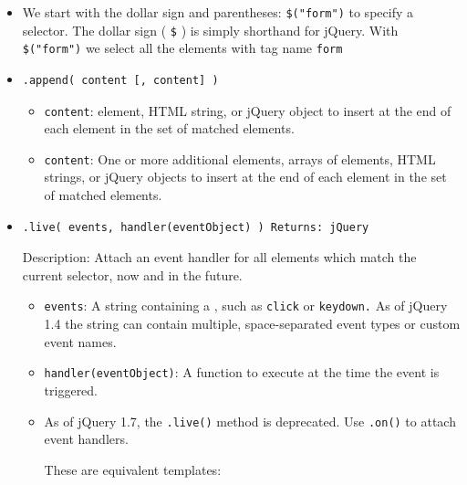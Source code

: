 \begin{itemize}
\item
We start with the dollar sign and parentheses:
\verb|$("form")| to specify a selector. 
The dollar sign ( \verb|$| ) is simply shorthand for jQuery.
With \verb|$("form")| we select all the elements with tag name \verb|form|

\item
\begin{verbatim}
.append( content [, content] )
\end{verbatim}
  \begin{itemize}
  \item
  \verb|content|:  element, HTML string, or jQuery object to insert
  at the end of each element in the set of matched elements.

  \item
  \verb|content|: One or more additional  elements, arrays of
  elements, HTML strings, or jQuery objects to insert at the end of
  each element in the set of matched elements.
  \end{itemize}

\item
\begin{verbatim}
.live( events, handler(eventObject) ) Returns: jQuery
\end{verbatim}
Description: Attach an event handler for all elements which match the current selector, now and in the future.

  \begin{itemize}
  \item
  \verb|events|: A string containing a , such as \verb"click" or \verb"keydown." 
  As of jQuery 1.4 the string can contain multiple, space-separated event types or custom event names.
  \item
  \verb|handler(eventObject)|: A function to execute at the time the event is triggered.

    \item 
    As of jQuery 1.7, the \verb|.live()| method is deprecated. 
    Use \verb|.on()| to attach event handlers. 

    These are equivalent templates:


\end{itemize}
\end{itemize}
